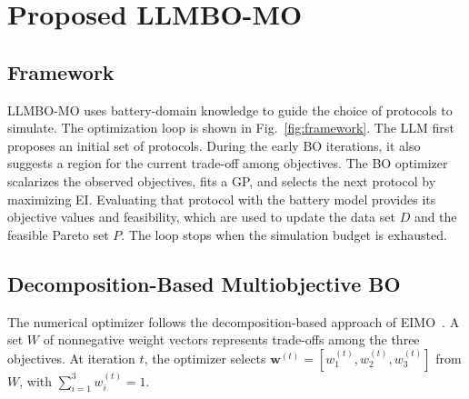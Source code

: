 
\section{Proposed LLMBO-MO}
\label{sec:method}

\subsection{Framework}
\label{sec:framework}

LLMBO-MO uses battery-domain knowledge to guide the choice of protocols to
simulate. The optimization loop is shown in Fig.~\ref{fig:framework}. The LLM
first proposes an initial set of protocols. During the early BO iterations,
it also suggests a region for the current trade-off among objectives. The BO
optimizer scalarizes the observed objectives, fits a GP, and selects the next
protocol by maximizing EI. Evaluating that protocol with the battery model
provides its objective values and feasibility, which are used to update the
data set $D$ and the feasible Pareto set $P$. The loop stops when the
simulation budget is exhausted.



\subsection{Decomposition-Based Multiobjective BO}
\label{sec:parego_backbone}

The numerical optimizer follows the decomposition-based approach of
EIMO~\cite{refEIMO}. A set $W$ of nonnegative weight vectors represents
trade-offs among the three objectives. At iteration $t$, the optimizer selects
$\mathbf w^{(t)}=[w_1^{(t)},w_2^{(t)},w_3^{(t)}]$ from $W$, with
$\sum_{i=1}^{3}w_i^{(t)}=1$.

